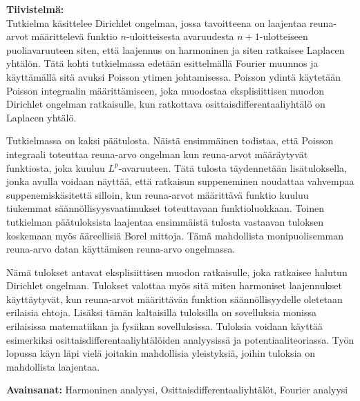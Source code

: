 \documentclass[a4paper, 11pt]{report}
\theoremstyle{plain}
\theoremstyle{definition}
\theoremstyle{remark}
\begin{document}
\noindent\textbf{Tiivistelmä:}\\ %
Tutkielma käsittelee Dirichlet ongelmaa, jossa tavoitteena on laajentaa reuna-arvot määrittelevä funktio $n$-uloitteisesta avaruudesta $n+1$-ulotteiseen puoliavaruuteen siten, että laajennus on harmoninen ja siten ratkaisee Laplacen yhtälön. Tätä kohti tutkielmassa edetään esittelmällä Fourier muunnos ja käyttämällä sitä avuksi Poisson ytimen johtamisessa. Poisson ydintä käytetään Poisson integraalin määrittämiseen, joka muodostaa eksplisiittisen muodon Dirichlet ongelman ratkaisulle, kun ratkottava osittaisdifferentaaliyhtälö on Laplacen yhtälö.

Tutkielmassa on kaksi päätulosta. Näistä ensimmäinen todistaa, että Poisson integraali toteuttaa reuna-arvo ongelman kun reuna-arvot määräytyvät funktiosta, joka kuuluu $L^p$-avaruuteen. Tätä tulosta täydennetään lisätuloksella, jonka avulla voidaan näyttää, että ratkaisun suppeneminen noudattaa vahvempaa suppenemiskäsitettä silloin, kun reuna-arvot määrittävä funktio kuuluu tiukemmat säännöllisyysvaatimukset toteuttavaan funktioluokkaan. Toinen tutkielman päätuloksista laajentaa ensimmäistä tulosta vastaavan tuloksen koskemaan myös ääreellisiä Borel mittoja. Tämä mahdollista monipuolisemman reuna-arvo datan käyttämisen reuna-arvo ongelmassa.

Nämä tulokset antavat eksplisiittisen muodon ratkaisulle, joka ratkaisee halutun Dirichlet ongelman. Tulokset valottaa myös sitä miten harmoniset laajennukset käyttäytyvät, kun reuna-arvot määrittävän funktion säännöllisyydelle oletetaan erilaisia ehtoja. Lisäksi tämän kaltaisilla tuloksilla on sovelluksia monissa erilaisissa matematiikan ja fysiikan sovelluksissa. Tuloksia voidaan käyttää esimerkiksi osittaisdifferentaaliyhtälöiden analyysissä ja potentiaaliteoriassa. Työn lopussa käyn läpi vielä joitakin mahdollisia yleistyksiä, joihin tuloksia on mahdollista laajentaa.

\vfill

\noindent\textbf{Avainsanat:} Harmoninen analyysi, Osittaisdifferentaaliyhtälöt, Fourier analyysi %

%
%
\cleardoublepage
\tableofcontents


%
%

\end{document}
